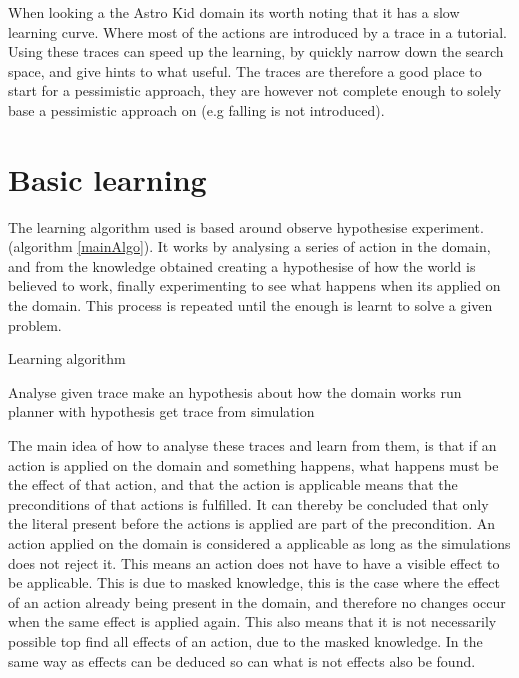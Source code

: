 	

	When looking a the Astro Kid domain its worth noting that it has a slow learning curve. Where most of the actions are introduced by a trace in a tutorial. Using these traces can speed up the learning, by quickly narrow down the search space, and give hints to what useful. The traces are therefore a good place to start for a pessimistic approach, they are however not complete enough to solely base a pessimistic approach on (e.g falling is not introduced).




\section{Basic learning}
	\label{basic}
	The learning algorithm used is based around observe hypothesise experiment. (algorithm \ref{mainAlgo}). It works by analysing a series of action in the domain, and from the knowledge obtained creating a hypothesise of how the world is believed to work, finally experimenting to see what happens when its applied on the domain. This process is repeated until the enough is learnt to solve a given problem.

	
	\begin{algorithm}
		\caption{Learning algorithm}
		\label{mainAlgo}
		\begin{algorithmic}[1]
			\State Analyse given trace
			\State make an hypothesis about how the domain works
			\State run planner with hypothesis
			\State get trace from simulation
			\EndWhile
			
		\end{algorithmic}
	\end{algorithm}	
	
%	
%	


	The main idea of how to analyse these traces and learn from them, is that if an action is applied on the domain and something happens, what happens must be the effect of that action, and that the action is applicable means that the preconditions of that actions is fulfilled. It can thereby be concluded that only the literal present before the actions is applied are part of the precondition. An action applied on the domain is considered a applicable as long as the simulations does not reject it. This means an action does not have to have a visible effect to be applicable. This is due to masked knowledge, this is the case where the effect of an action already being present in the domain, and therefore no changes occur when the same effect is applied again. This also means that it is not necessarily possible top find all effects of an action, due to the masked knowledge. In the same way as effects can be deduced so can what is not effects also be found.
	
